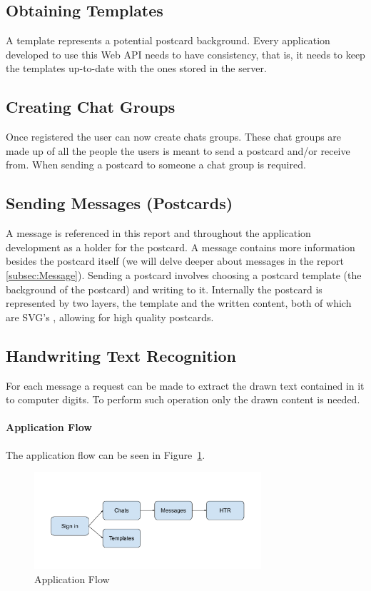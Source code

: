 \subsection{Obtaining Templates}
A template represents a potential postcard background. Every application developed to use this Web API needs to have consistency, that is, it needs to keep the templates up-to-date with the ones stored in the server.


\subsection{Creating Chat Groups}
Once registered the user can now create chats groups. These chat groups are made up of all the people the users is meant to send a postcard and/or receive from.
When sending a postcard to someone a chat group is required.  

\subsection{Sending Messages (Postcards)}
A message is referenced in this report and throughout the application development as a holder for the postcard. A message contains more information besides the postcard itself (we will delve deeper about messages in the report \ref{subsec:Message}).
Sending a postcard involves choosing a postcard template (the background of the postcard) and  writing to it. 
Internally the postcard is represented by two layers, the template and the written content, both of which are SVG's \textit{\cite{SVG}}, allowing for high quality postcards. 

\subsection{Handwriting Text Recognition}
For each message a request can be made to extract the drawn text contained in it to computer digits. To perform such operation only the drawn content is needed.

\bigskip

\paragraph{Application Flow}

The application flow can be seen in Figure~\ref{fig:AppFlow}.

\begin{figure}[!ht]
	\centering
	\includegraphics[width=0.75\textwidth]{./Chapter3/Figures/Application Flow}
	\caption{Application Flow}
	\label{fig:AppFlow}
\end{figure}